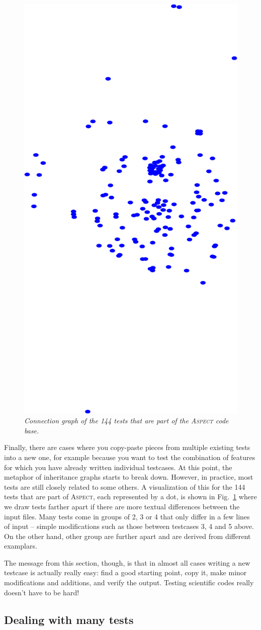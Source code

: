\documentclass{article}
\newcommand{\aspect}{\textsc{Aspect}}
\begin{document}
\begin{figure}
  \begin{center}
    \vspace*{-24pt}
    \includegraphics[height=0.45\textwidth,angle=-90]{figures/graph.png}
    \vspace*{-12pt}
  \end{center}
  \caption{\it Connection graph of the 144 tests that are part of the
    \aspect{} code base.}
  \vspace*{-3mm}
  \label{fig:aspect-tests}
\end{figure}
Finally, there are cases where you copy-paste pieces from multiple existing
tests into a new one, for example because you want to test the combination of
features for which you have already written individual testcases. At this
point, the metaphor of inheritance graphs starts to break down. However, in
practice, most tests are still closely related to some others. A visualization
of this for the 144 tests that are part of \aspect{}, each represented by a
dot, is shown in Fig.~\ref{fig:aspect-tests} where we draw tests farther apart
if there are more textual differences between the input files. Many tests come
in groups of 2, 3 or 4 that only differ in a few lines of input -- simple
modifications such as those between testcases 3, 4 and 5 above. On the other
hand, other group are further apart and are derived from different
examplars.

The message from this section, though, is that in almost all cases writing a
new testcase is actually really easy: find a good starting point, copy it,
make minor modifications and additions, and verify the output. Testing
scientific codes really doesn't have to be hard!

\subsection{Dealing with many tests}
\label{sec:many-tests}
\end{document}
